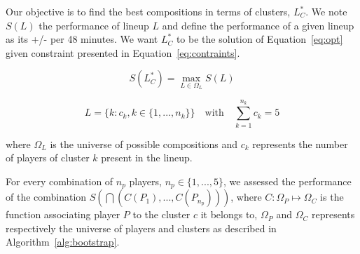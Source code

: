 \begin{table}
  \small
  \centering
  \caption{Lineup distribution}
  \label{tab:lus}
  
\end{table} 


Our objective is to find the best compositions in terms of clusters, $L^*_C$.
We note $S(L)$ the performance of lineup $L$ and define the performance of a given lineup as its +/- per 48 minutes.
We want $L^*_C$ to be the solution of Equation~\ref{eq:opt} given constraint presented in Equation~\ref{eq:contraints}. 

\begin{equation}
  \label{eq:opt}
  S(L^*_C) = \max_{L \in \Omega_L} S(L)  
\end{equation}

\begin{equation}
  \label{eq:contraints}
  L = \{k : c_k, k \in \{1, ..., n_k\}\}\quad \text{with} \quad \sum_{k = 1}^{n_k} c_k = 5
\end{equation}

where $\Omega_L$ is the universe of possible compositions and $c_k$ represents the number of players of cluster $k$ present in the lineup.


For every combination of $n_p$ players, $n_p \in \{1, ..., 5\}$, we assessed the performance of the combination $S\left(\bigcap (C(P_1), ... , C(P_{n_p}))\right)$, where $C: \Omega_P \mapsto \Omega_C$ is the function associating player $P$ to the cluster $c$ it belongs to, $\Omega_P$ and $\Omega_C$ represents respectively the universe of players and clusters as described in Algorithm~\ref{alg:bootstrap}.

